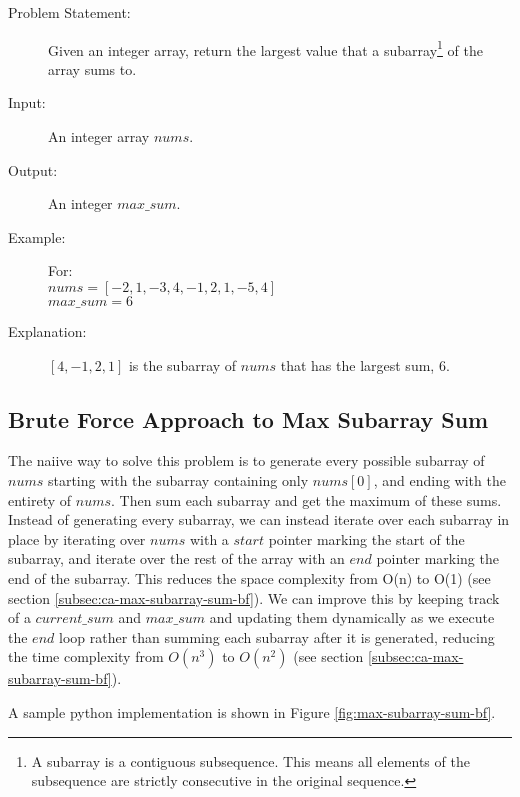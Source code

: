 \begin{description}
    \item[Problem Statement:]
        Given an integer array, return the largest value that a subarray\footnote{A subarray is a contiguous subsequence. This means all elements of the subsequence are strictly consecutive in the original sequence.} of the array sums to.

    \item[Input:]
        An integer array $nums$.
        
    \item[Output:]
        An integer $max\_sum$. 
        
    \item[Example:] For:\\
        $nums =  [-2,1,-3,4,-1,2,1,-5,4]$\\
        $max\_sum = 6$
        
    \item[Explanation:]
        $[4,-1,2,1]$ is the subarray of $nums$ that has the largest sum, 6.
        
\end{description}


\subsection{Brute Force Approach to Max Subarray Sum}
The naiive way to solve this problem is to generate every possible subarray of $nums$
starting with the subarray containing only $nums[0]$, and ending with the entirety of $nums$.
Then sum each subarray and get the maximum of these sums.
Instead of generating every subarray, we can instead iterate over each subarray in place by iterating over $nums$ with a $start$ pointer marking the start of the subarray,
and iterate over the rest of the array with an $end$ pointer marking the end of the subarray. This reduces the space complexity from O(n) to O(1) (see section \ref{subsec:ca-max-subarray-sum-bf}).
We can improve this by keeping track of a $current\_sum$ and $max\_sum$ and updating them dynamically as we execute the $end$ loop rather than summing each subarray after it is generated,
reducing the time complexity from $O(n^3)$ to $O(n^2)$ (see section \ref{subsec:ca-max-subarray-sum-bf}).

A sample python implementation is shown in Figure \ref{fig:max-subarray-sum-bf}.

